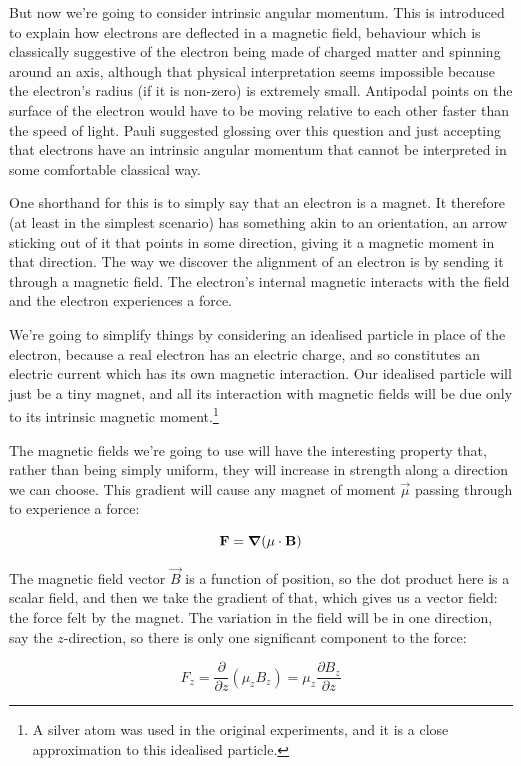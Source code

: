 But now we're going to consider intrinsic angular momentum. This is introduced to explain how electrons are deflected in a magnetic field, behaviour which is classically suggestive of the electron being made of charged matter and spinning around an axis, although that physical interpretation seems impossible because the electron's radius (if it is non-zero) is extremely small. Antipodal points on the surface of the electron would have to be moving relative to each other faster than the speed of light. Pauli suggested glossing over this question and just accepting that electrons have an intrinsic angular momentum that cannot be interpreted in some comfortable classical way.

One shorthand for this is to simply say that an electron is a magnet. It therefore (at least in the simplest scenario) has something akin to an orientation, an arrow sticking out of it that points in some direction, giving it a magnetic moment in that direction. The way we discover the alignment of an electron is by sending it through a magnetic field. The electron's internal magnetic interacts with the field and the electron experiences a force.

We're going to simplify things by considering an idealised particle in place of the electron, because a real electron has an electric charge, and so constitutes an electric current which has its own magnetic interaction. Our idealised particle will just be a tiny magnet, and all its interaction with magnetic fields will be due only to its intrinsic magnetic moment.\footnote{A silver atom was used in the original experiments, and it is a close approximation to this idealised particle.}

The magnetic fields we're going to use will have the interesting property that, rather than being simply uniform, they will increase in strength along a direction we can choose. This gradient will cause any magnet of moment $\vec{\mu}$ passing through to experience a force:

$$
\mathbf{F} = \grad(\mathbf{\mu} \cdot \mathbf{B})
$$

The magnetic field vector $\vec{B}$ is a function of position, so the dot product here is a scalar field, and then we take the gradient of that, which gives us a vector field: the force felt by the magnet. The variation in the field will be in one direction, say the $z$-direction, so there is only one significant component to the force:

$$
F_z = \frac{\partial}{\partial z}(\mu_z B_z)
= \mu_z \frac{\partial B_z}{\partial z}
$$

